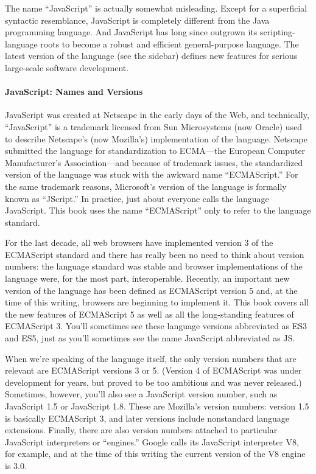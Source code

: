The name “JavaScript” is actually somewhat misleading. Except for a superficial syntactic
resemblance, JavaScript is completely different from the Java programming language.
And JavaScript has long since outgrown its scripting-language roots to become
a robust and efficient general-purpose language. The latest version of the language (see
the sidebar) defines new features for serious large-scale software development.

\paragraph*{JavaScript: Names and Versions}
\hfill \break
JavaScript was created at Netscape in the early days of the Web, and technically, “JavaScript”
is a trademark licensed from Sun Microsystems (now Oracle) used to describe
Netscape’s (now Mozilla’s) implementation of the language. Netscape submitted the
language for standardization to ECMA—the European Computer Manufacturer’s Association—and
because of trademark issues, the standardized version of the language
was stuck with the awkward name “ECMAScript.” For the same trademark reasons,
Microsoft’s version of the language is formally known as “JScript.” In practice, just
about everyone calls the language JavaScript. This book uses the name “ECMAScript”
only to refer to the language standard.


For the last decade, all web browsers have implemented version 3 of the ECMAScript
standard and there has really been no need to think about version numbers: the language
standard was stable and browser implementations of the language were, for the
most part, interoperable. Recently, an important new version of the language has been
defined as ECMAScript version 5 and, at the time of this writing, browsers are beginning
to implement it. This book covers all the new features of ECMAScript 5 as well as all
the long-standing features of ECMAScript 3. You’ll sometimes see these language versions
abbreviated as ES3 and ES5, just as you’ll sometimes see the name JavaScript
abbreviated as JS.


When we’re speaking of the language itself, the only version numbers that are relevant
are ECMAScript versions 3 or 5. (Version 4 of ECMAScript was under development
for years, but proved to be too ambitious and was never released.) Sometimes, however,
you’ll also see a JavaScript version number, such as JavaScript 1.5 or JavaScript 1.8.
These are Mozilla’s version numbers: version 1.5 is basically ECMAScript 3, and later
versions include nonstandard language extensions. Finally, there are
also version numbers attached to particular JavaScript interpreters or “engines.” Google
calls its JavaScript interpreter V8, for example, and at the time of this writing the
current version of the V8 engine is 3.0.


